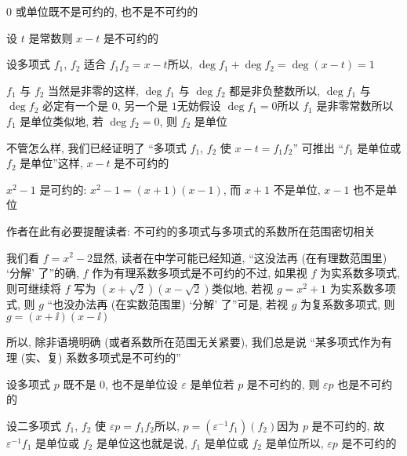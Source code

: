 \begin{remark}
    $0$ 或单位既不是可约的, 也不是不可约的\period
\end{remark}

\begin{example}
    设 $t$ 是常数\period 则 $x-t$ 是不可约的\period

    设多项式 $f_1$, $f_2$ 适合 $f_1 f_2 = x-t$\period 所以, $\deg f_1 + \deg f_2 = \deg (x-t) = 1$\period

    $f_1$ 与 $f_2$ 当然是非零的\period 这样, $\deg f_1$ 与 $\deg f_2$ 都是非负整数\period 所以, $\deg f_1$ 与 $\deg f_2$ 必定有一个是 $0$, 另一个是 $1$\period 无妨假设 $\deg f_1 = 0$\period 所以 $f_1$ 是非零常数\period 所以 $f_1$ 是单位\period 类似地, 若 $\deg f_2 = 0$, 则 $f_2$ 是单位\period

    不管怎么样, 我们已经证明了 ``多项式 $f_1$, $f_2$ 使 $x-t = f_1 f_2$'' 可推出 ``$f_1$ 是单位或 $f_2$ 是单位''\period 这样, $x-t$ 是不可约的\period
\end{example}

\begin{example}
    $x^2 - 1$ 是可约的: $x^2 - 1 = (x+1) (x-1)$, 而 $x+1$ 不是单位, $x-1$ 也不是单位\period
\end{example}

\begin{remark}
    作者在此有必要提醒读者: 不可约的多项式与多项式的系数所在范围密切相关\period

    我们看 $f = x^2 - 2$\period 显然, 读者在中学可能已经知道, ``这没法再 (在有理数范围里) `分解' 了''\period 的确, $f$ 作为有理系数多项式是不可约的\period 不过, 如果视 $f$ 为实系数多项式, 则可继续将 $f$ 写为 $(x + \sqrt2) (x - \sqrt2)$\period 类似地, 若视 $g = x^2 + 1$ 为实系数多项式, 则 $g$ ``也没办法再 (在实数范围里) `分解' 了''\period 可是, 若视 $g$ 为复系数多项式, 则 $g = (x + \ii) (x - \ii)$\period

    所以, 除非语境明确 (或者系数所在范围无关紧要), 我们总是说 ``某多项式作为有理 (实、复) 系数多项式是不可约的''\period
\end{remark}

\begin{proposition}
    设多项式 $p$ 既不是 $0$, 也不是单位\period 设 $\varepsilon$ 是单位\period 若 $p$ 是不可约的, 则 $\varepsilon p$ 也是不可约的\period
\end{proposition}

\begin{pf}
    设二多项式 $f_1$, $f_2$ 使 $\varepsilon p = f_1 f_2$\period 所以, $p = (\varepsilon^{-1} f_1) (f_2)$\period 因为 $p$ 是不可约的, 故 $\varepsilon^{-1} f_1$ 是单位或 $f_2$ 是单位\period 这也就是说, $f_1$ 是单位或 $f_2$ 是单位\period 所以, $\varepsilon p$ 是不可约的\period
\end{pf}

